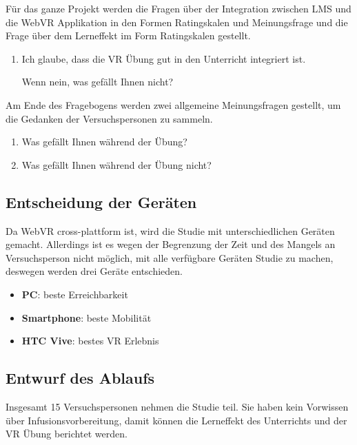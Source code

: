 Für das ganze Projekt werden die Fragen über der Integration zwischen LMS und die WebVR Applikation in den Formen Ratingskalen und Meinungsfrage und die Frage über dem Lerneffekt im Form Ratingskalen gestellt.

\begin{enumerate}
    \item Ich glaube, dass die VR Übung gut in den Unterricht integriert ist.
    
    Wenn nein, was gefällt Ihnen nicht?
%    
\end{enumerate}

Am Ende des Fragebogens werden zwei allgemeine Meinungsfragen gestellt, um die Gedanken der Versuchspersonen zu sammeln.

\begin{enumerate}
    \item Was gefällt Ihnen während der Übung?
    
    \item Was gefällt Ihnen während der Übung nicht?
\end{enumerate}

\subsection{Entscheidung der Geräten}

Da WebVR cross-plattform ist, wird die Studie mit unterschiedlichen Geräten gemacht. Allerdings ist es wegen der Begrenzung der Zeit und des Mangels an Versuchsperson nicht möglich, mit alle verfügbare Geräten Studie zu machen, deswegen werden drei Geräte entschieden.

\begin{itemize}
    \item \textbf{PC}: beste Erreichbarkeit
    \item \textbf{Smartphone}: beste Mobilität
    \item \textbf{HTC Vive}: bestes VR Erlebnis
\end{itemize}

\subsection{Entwurf des Ablaufs}

Insgesamt 15 Versuchspersonen nehmen die Studie teil. Sie haben kein Vorwissen über Infusionsvorbereitung, damit können die Lerneffekt des Unterrichts und der VR Übung berichtet werden.

